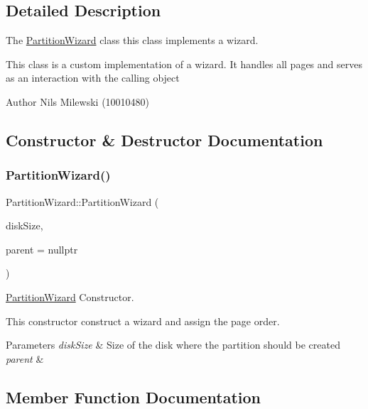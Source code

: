 \subsection{Detailed Description}
The \mbox{\hyperlink{class_partition_wizard}{Partition\+Wizard}} class this class implements a wizard. 

This class is a custom implementation of a wizard. It handles all pages and serves as an interaction with the calling object \begin{DoxyAuthor}{Author}
Nils Milewski (10010480) 
\end{DoxyAuthor}


\subsection{Constructor \& Destructor Documentation}
\mbox{\label{class_partition_wizard_aab98955e5371a971ac94b7f0d4b24258}} 
\subsubsection{\texorpdfstring{Partition\+Wizard()}{PartitionWizard()}}
{\footnotesize\ttfamily Partition\+Wizard\+::\+Partition\+Wizard (\begin{DoxyParamCaption}\item[{unsigned long long}]{disk\+Size,  }\item[{Q\+Widget $\ast$}]{parent = {\ttfamily nullptr} }\end{DoxyParamCaption})}



\mbox{\hyperlink{class_partition_wizard}{Partition\+Wizard}} Constructor. 

This constructor construct a wizard and assign the page order. 
\begin{DoxyParams}{Parameters}
{\em disk\+Size} & Size of the disk where the partition should be created \\
\hline
{\em parent} & \\
\hline
\end{DoxyParams}


\subsection{Member Function Documentation}
\mbox{\label{class_partition_wizard_af5141307f45f8fc9bd091c718a0f31b6}} 
